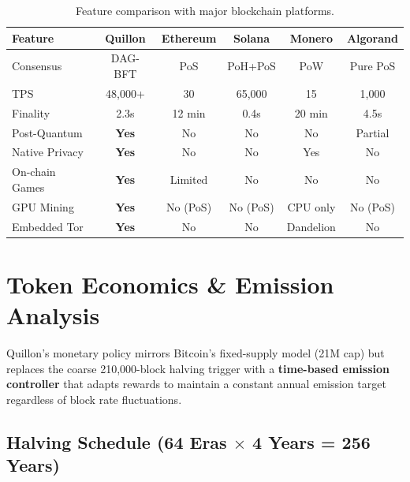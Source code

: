 \documentclass[11pt,a4paper]{article}
\begin{document}
\begin{table}[H]
\centering
\small
\begin{tabular}{l c c c c c}
\toprule
\textbf{Feature} & \textbf{Quillon} & \textbf{Ethereum} & \textbf{Solana} & \textbf{Monero} & \textbf{Algorand} \\
\midrule
Consensus & DAG-BFT & PoS & PoH+PoS & PoW & Pure PoS \\
TPS & 48,000+ & 30 & 65,000 & 15 & 1,000 \\
Finality & 2.3s & 12 min & 0.4s & 20 min & 4.5s \\
Post-Quantum & \cellcolor{qgreen!20}\textbf{Yes} & No & No & No & Partial \\
Native Privacy & \cellcolor{qgreen!20}\textbf{Yes} & No & No & \cellcolor{qgreen!20}Yes & No \\
On-chain Games & \cellcolor{qgreen!20}\textbf{Yes} & Limited & No & No & No \\
GPU Mining & \cellcolor{qgreen!20}\textbf{Yes} & No (PoS) & No (PoS) & CPU only & No (PoS) \\
Embedded Tor & \cellcolor{qgreen!20}\textbf{Yes} & No & No & Dandelion & No \\
\bottomrule
\end{tabular}
\caption{Feature comparison with major blockchain platforms.}
\end{table}

\section{Token Economics \& Emission Analysis}

Quillon's monetary policy mirrors Bitcoin's fixed-supply model (21M cap) but replaces the coarse 210,000-block halving trigger with a \textbf{time-based emission controller} that adapts rewards to maintain a constant annual emission target regardless of block rate fluctuations.

\subsection{Halving Schedule (64 Eras $\times$ 4 Years = 256 Years)}
\end{document}
